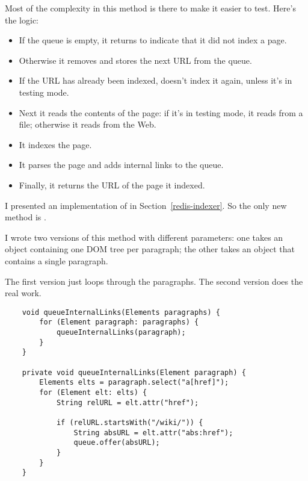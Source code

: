 \documentclass[12pt]{book}
\theoremstyle{exercise}
\begin{document}
Most of the complexity in this method is there to make it easier to
test. Here's the logic:

\begin{itemize}

\item
  If the queue is empty, it returns  to indicate that it
  did not index a page.

\item
  Otherwise it removes and stores the next URL from the queue.

\item
  If the URL has already been indexed,  doesn't index it
  again, unless it's in testing mode.

\item
  Next it reads the contents of the page: if it's in testing mode, it
  reads from a file; otherwise it reads from the Web.

\item
  It indexes the page.

\item
  It parses the page and adds internal links to the queue.

\item
  Finally, it returns the URL of the page it indexed.

\end{itemize}

I presented an implementation of  in
Section~\ref{redis-indexer}. So the only new method is
.


I wrote two versions of this method with different parameters: one
takes an  object containing one DOM tree per
paragraph; the other takes an  object that contains a
single paragraph.


The first version just loops through the paragraphs. The second version
does the real work.

\begin{verbatim}
    void queueInternalLinks(Elements paragraphs) {
        for (Element paragraph: paragraphs) {
            queueInternalLinks(paragraph);
        }
    }

    private void queueInternalLinks(Element paragraph) {
        Elements elts = paragraph.select("a[href]");
        for (Element elt: elts) {
            String relURL = elt.attr("href");

            if (relURL.startsWith("/wiki/")) {
                String absURL = elt.attr("abs:href");
                queue.offer(absURL);
            }
        }
    }
\end{verbatim}
\end{document}
